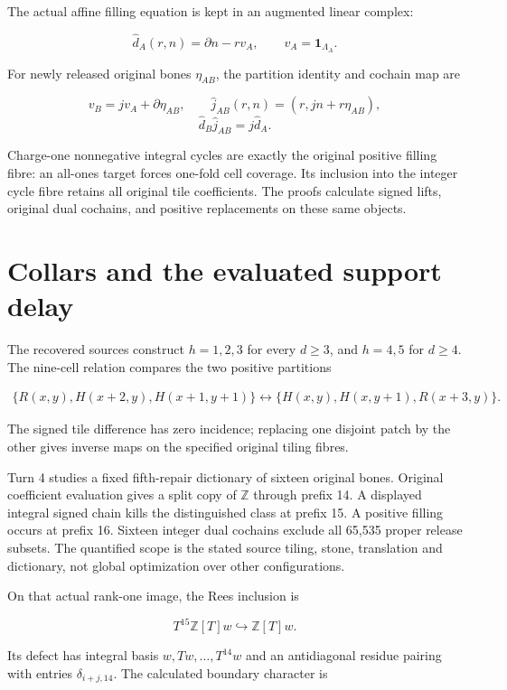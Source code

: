 \documentclass[
  10pt,
]{scrreprt}
\begin{document}
The actual affine filling equation is kept in an augmented linear
complex:

\[\widehat d_A(r,n)=\partial n-rv_A,\qquad v_A=\mathbf1_{\Lambda_A}.\]

For newly released original bones \(\eta_{AB}\), the partition identity
and cochain map are

\[v_B=jv_A+\partial\eta_{AB},\qquad
\widehat j_{AB}(r,n)=(r,jn+r\eta_{AB}),\]
\[\widehat d_B\widehat j_{AB}=j\widehat d_A.\]

Charge-one nonnegative integral cycles are exactly the original positive
filling fibre: an all-ones target forces one-fold cell coverage. Its
inclusion into the integer cycle fibre retains all original tile
coefficients. The proofs calculate signed lifts, original dual cochains,
and positive replacements on these same objects.

\section{Collars and the evaluated support
delay}\label{collars-and-the-evaluated-support-delay}

The recovered sources construct \(h=1,2,3\) for every \(d\ge3\), and
\(h=4,5\) for \(d\ge4\). The nine-cell relation compares the two
positive partitions

\[\begin{aligned}
\{R(x,y),H(x+2,y),H(x+1,y+1)\}
\longleftrightarrow
\{H(x,y),H(x,y+1),R(x+3,y)\}.
\end{aligned}\]

The signed tile difference has zero incidence; replacing one disjoint
patch by the other gives inverse maps on the specified original tiling
fibres.

Turn 4 studies a fixed fifth-repair dictionary of sixteen original
bones. Original coefficient evaluation gives a split copy of
\(\mathbb Z\) through prefix 14. A displayed integral signed chain kills
the distinguished class at prefix 15. A positive filling occurs at
prefix 16. Sixteen integer dual cochains exclude all 65,535 proper
release subsets. The quantified scope is the stated source tiling,
stone, translation and dictionary, not global optimization over other
configurations.

On that actual rank-one image, the Rees inclusion is

\[T^{15}\mathbb Z[T]w\hookrightarrow\mathbb Z[T]w.\]

Its defect has integral basis \(w,Tw,\ldots,T^{14}w\) and an
antidiagonal residue pairing with entries \(\delta_{i+j,14}\). The
calculated boundary character is
\end{document}

